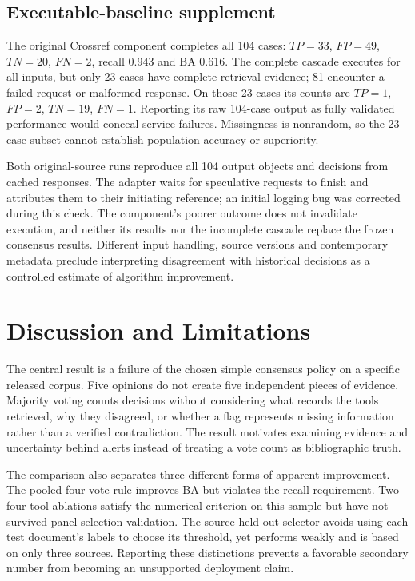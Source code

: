 \documentclass[acmsmall,screen,nonacm]{acmart}
\begin{document}
\subsection{Executable-baseline supplement}
The original Crossref component completes all 104 cases: $TP=33$, $FP=49$, $TN=20$, $FN=2$, recall 0.943 and BA 0.616. The complete cascade executes for all inputs, but only 23 cases have complete retrieval evidence; 81 encounter a failed request or malformed response. On those 23 cases its counts are $TP=1$, $FP=2$, $TN=19$, $FN=1$. Reporting its raw 104-case output as fully validated performance would conceal service failures. Missingness is nonrandom, so the 23-case subset cannot establish population accuracy or superiority.

Both original-source runs reproduce all 104 output objects and decisions from cached responses. The adapter waits for speculative requests to finish and attributes them to their initiating reference; an initial logging bug was corrected during this check. The component's poorer outcome does not invalidate execution, and neither its results nor the incomplete cascade replace the frozen consensus results. Different input handling, source versions and contemporary metadata preclude interpreting disagreement with historical decisions as a controlled estimate of algorithm improvement.

\section{Discussion and Limitations}
The central result is a failure of the chosen simple consensus policy on a specific released corpus. Five opinions do not create five independent pieces of evidence. Majority voting counts decisions without considering what records the tools retrieved, why they disagreed, or whether a flag represents missing information rather than a verified contradiction. The result motivates examining evidence and uncertainty behind alerts instead of treating a vote count as bibliographic truth.

The comparison also separates three different forms of apparent improvement. The pooled four-vote rule improves BA but violates the recall requirement. Two four-tool ablations satisfy the numerical criterion on this sample but have not survived panel-selection validation. The source-held-out selector avoids using each test document's labels to choose its threshold, yet performs weakly and is based on only three sources. Reporting these distinctions prevents a favorable secondary number from becoming an unsupported deployment claim.
\end{document}
